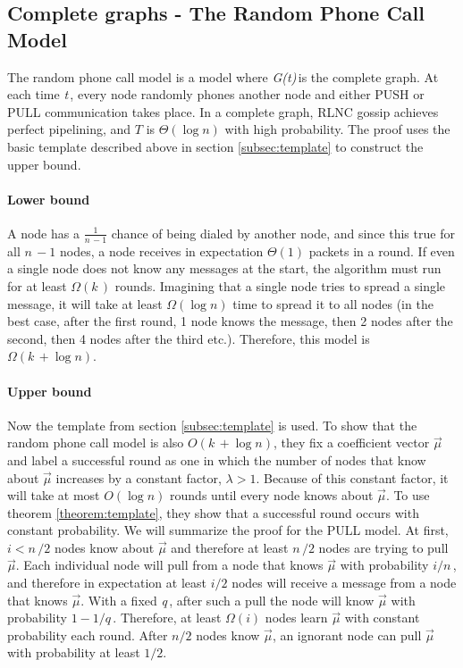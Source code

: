 \documentclass{article} %
\def\numNodes{\textit{n}\,}
\def\graph{\textit{G(t)}\,}
\def\graphtime{\textit{t}\,}
\def\numMessages{\textit{k}\,}
\def\fieldSize{\textit{q}\,}
\begin{document}
\subsection{Complete graphs - The Random Phone Call Model}\label{subsec:randomphonecall}
The random phone call model is a model where \graph is the complete graph. At each time \graphtime, every node randomly phones another node and either PUSH or PULL communication takes place.  In a complete graph, RLNC gossip achieves perfect pipelining, and $T$ is $\Theta(\log{n})$ with high probability. The proof uses the basic template described above in section \ref{subsec:template} to construct the upper bound. 
\paragraph{Lower bound}
A node has a $\frac{1}{\numNodes-1}$ chance of being dialed by another node, and since this true for all $\numNodes-1$ nodes, a node receives in expectation $\Theta(1)$ packets in a round. If even a single node does not know any messages at the start, the algorithm must run for at least $\Omega(\numMessages)$ rounds. Imagining that a single node tries to spread a single message, it will take at least $\Omega(\log{n})$ time to spread it to all nodes (in the best case, after the first round, 1 node knows the message, then 2 nodes after the second, then 4 nodes after the third etc.). Therefore, this model is $\Omega(\numMessages + \log{n})$.
\paragraph{Upper bound}
Now the template from section \ref{subsec:template} is used. To show that the random phone call model is also $O(\numMessages + \log{n})$, they fix a coefficient vector $\vec{\mu}$ and label a successful round as one in which the number of nodes that know about $\vec{\mu}$ increases by a constant factor, $\lambda > 1$. Because of this constant factor, it will take at most $O(\log{n})$ rounds until every node knows about $\vec{\mu}$. To use theorem \ref{theorem:template}, they show that a successful round occurs with constant probability. We will summarize the proof for the PULL model. At first, $i < \numNodes/2$ nodes know about $\vec{\mu}$ and therefore at least $\numNodes/2$ nodes are trying to pull $\vec{\mu}$. Each individual node will pull from a node that knows $\vec{\mu}$ with probability $i/\numNodes$, and therefore in expectation at least $i/2$ nodes will receive a message from a node that knows $\vec{\mu}$. With a fixed \fieldSize, after such a pull the node will know $\vec{\mu}$ with probability $1-1/\fieldSize$.  Therefore, at least $\Omega(i)$ nodes learn $\vec{\mu}$ with constant probability each round. After $n/2$ nodes know $\vec{\mu}$, an ignorant node can pull $\vec{\mu}$ with probability at least $1/2$.
\end{document}

